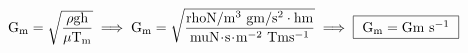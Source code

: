 \documentclass{article}
\newcommand{\myspace}{0.5cm}
\begin{document}
\vspace{\myspace}

\begin{center}
	$
		\mathrm
		{
			G_{m} = \sqrt{\dfrac{\rho g h}{\mu T_{m}}}
		} 
		\implies
		\mathrm
		{
			G_{m} = \sqrt{\dfrac{ {{rho}} N/m^{3} \ {{g}}m/s^{2} \cdot  {{h}}m }{ {{mu}} N \! \cdot \! s \! \cdot \! m^{-2} \ {{Tm}}s^{-1} }} } 
		\implies 
		\fbox
		{
			$\mathrm
			{
				G_{m} = {{Gm}} \ s^{-1}
			}$
		}
	$
\end{center}


\end{document}
